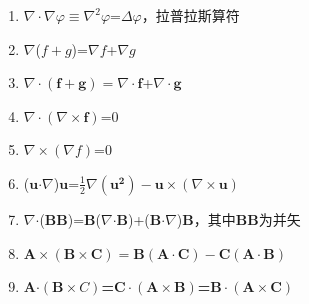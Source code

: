 \documentclass[UTF8]{ctexart}
\newcommand{\tmmathbf}[1]{\ensuremath{\boldsymbol{#1}}}
\newcommand{\tmtextbf}[1]{{\bfseries{#1}}}
\begin{document}
\begin{enumerate}
  \item $\nabla \cdot \nabla \varphi \equiv \nabla^2 \varphi$=$\Delta
  \varphi$，拉普拉斯算符
  
  \item $\nabla$($f + g$)=$\nabla f$+$\nabla g$
  
  \item $\nabla \cdot (\tmmathbf{f +} \tmmathbf{g}) = \nabla \cdot
  \tmmathbf{f}$+$\nabla \cdot \tmmathbf{g}$
  
  \item $\nabla \cdot (\nabla \times \tmmathbf{f})$=0
  
  \item $\nabla \times (\nabla f)$=0
  
  \item (\tmtextbf{$\tmmathbf{u}
  \tmmathbf{\cdot}$}$\nabla$)$\tmmathbf{u}$=$\frac{1}{2} \nabla
  (\tmmathbf{u^2}) - \tmmathbf{u \times} (\nabla \times \tmmathbf{u})$
  
  \item $\nabla
  \tmmathbf{\cdot}$(\tmtextbf{B}\tmtextbf{B})=\tmtextbf{B}($\nabla
  \tmmathbf{\cdot}
  \tmmathbf{B}$)+(\tmtextbf{B$\cdot$}$\nabla$)$\tmmathbf{B}$，其中\tmtextbf{B}\tmtextbf{B}为并矢
  
  \item $\tmmathbf{A \times} (\tmmathbf{B} \times \tmmathbf{C}) = \tmmathbf{B
  (\tmmathbf{A \cdot C})} - \tmmathbf{C (\tmmathbf{A \cdot} B)}$
  
  \item \tmtextbf{A$\cdot (\tmmathbf{B \times} C)$=$\tmmathbf{C \cdot
  (\tmmathbf{A \times} B)}$=}$\tmmathbf{B \cdot (\tmmathbf{A} \times
  \tmmathbf{C})}$
\end{enumerate}
\end{document}
